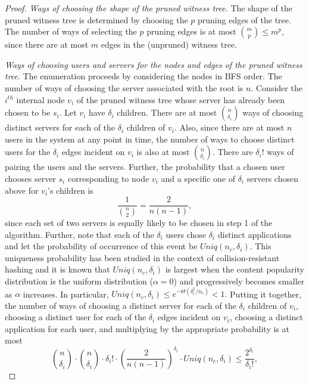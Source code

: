 \documentclass[conference]{IEEEtran}
\begin{document}
\begin{proof}
{\em Ways of choosing the shape of the pruned witness tree.}
The shape of the pruned witness tree is determined by choosing the $p$ pruning edges of the tree. The number of ways of selecting the $p$ pruning edges is at most ${m  \choose p} \leq m^{p},$ since there are at most $m$ edges in the (unpruned) witness tree. 

{\em Ways of choosing users and
servers for the nodes and edges of the pruned witness tree}. The enumeration
proceeds by considering the nodes in BFS order.  The number of ways of
choosing the server associated with the root is $n$. Consider the $i^{th}$ internal node $v_i$ of the pruned witness tree
whose server has already been chosen to be $s_i$. Let $v_i$ have $\delta_i$
children. There are at most ${ {n} \choose {\delta_i} }$ ways of
choosing distinct servers for each of the $\delta_i$ children of
$v_i$.  Also, since there are at most $n$ users in the system
at any point in time, the number of ways to choose 
distinct users for the
$\delta_i$ edges incident on $v_i$ is also at most
${ {n} \choose {\delta_i}}$. There are ${\delta_i}!$
ways of pairing the users and the servers.
Further, the probability that a chosen user
chooses server $s_i$ corresponding to node $v_i$ and a specific one of
$\delta_i$ servers chosen above for $v_i$'s children is $$
\frac{1}{{n \choose 2}} = \frac{2}{n (n - 1)},$$ since each set of two servers is equally likely to be chosen in step 1 of the algorithm. Further, note that each of the $\delta_i$ users chose $\delta_i$ distinct applications and let the probability of occurrence of this event be $Uniq(n_c, \delta_i)$. This uniqueness probability has been studied in the context of collision-resistant hashing and it is known \cite{bellare2004hash} that
$Uniq(n_c, \delta_i)$ is largest when the content popularity distribution is the uniform distribution ($\alpha = 0$) and progressively becomes smaller as $\alpha$ increases. In particular, 
$Uniq(n_c, \delta_i) \leq e^{-\Theta(\delta^2_i/n_c)} < 1.$
Putting it together, the number of ways of choosing a distinct
server for each of the $\delta_i$ children of $v_i$, choosing a distinct
user for each of the $\delta_i$ edges incident on $v_i$, choosing a distinct application for each user, and  multiplying by the appropriate probability is at most 
\begin{equation}
\label{eq:expbd}
 {n \choose \delta_i} \cdot {n \choose \delta_i} \cdot {\delta_i}! \cdot \left (
\frac{2}{n (n - 1)}\right)^{\delta_i} \cdot Uniq(n_c, \delta_i) \leq \frac{2^{\delta_i}}{
\delta_i!}, 
\end{equation} 

\end{proof}
\end{document}
